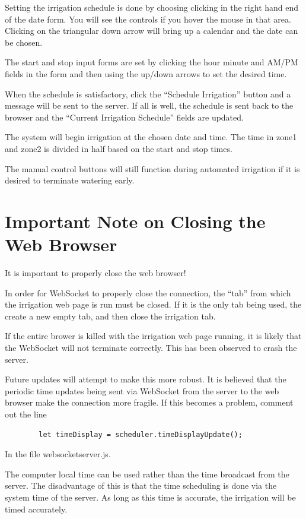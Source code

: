 Setting the irrigation schedule is done by choosing clicking in the right hand 
end of the date form.  You will see the controls if you hover the mouse in that 
area.  Clicking on the triangular down arrow will bring up a calendar and the 
date can be chosen.

The start and stop input forms are set by clicking the hour minute and AM/PM 
fields in the form and then using the up/down arrows to set the desired time.

When the schedule is satisfactory, click the ``Schedule Irrigation'' button and 
a message will be sent to the server.  If all is well, the schedule is sent 
back to the browser and the ``Current Irrigation Schedule'' fields are updated.

The system will begin irrigation at the chosen date and time.  The time in 
zone1 and zone2 is divided in half based on the start and stop times.

The manual control buttons will still function during automated irrigation if 
it is desired to terminate watering early.

\section{Important Note on Closing the Web Browser}

It is important to properly close the web browser!

In order for WebSocket to properly close the connection, the ``tab'' from
which the irrigation web page is run must be closed.  If it is the only tab being used,
the create a new empty tab, and then close the irrigation tab.

If the entire brower is killed with the irrigation web page running, it is likely
that the WebSocket will not terminate correctly.  This has been observed to crash
the server.

Future updates will attempt to make this more robust.  It is believed that the periodic
time updates being sent via WebSocket from the server to the web browser make the
connection more fragile.  If this becomes a problem, comment out the line

\begin{verbatim}
        let timeDisplay = scheduler.timeDisplayUpdate();
\end{verbatim}

In the file websocketserver.js.

The computer local time can be used rather than the time broadcast from the server.
The disadvantage of this is that the time scheduling is done via the system time
of the server.  As long as this time is accurate, the irrigation will be timed accurately.








 
